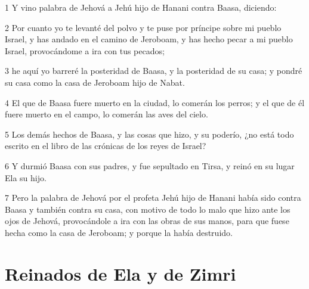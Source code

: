 \par 1 Y vino palabra de Jehová a Jehú hijo de Hanani contra Baasa, diciendo:
\par 2 Por cuanto yo te levanté del polvo y te puse por príncipe sobre mi pueblo Israel, y has andado en el camino de Jeroboam, y has hecho pecar a mi pueblo Israel, provocándome a ira con tus pecados;
\par 3 he aquí yo barreré la posteridad de Baasa, y la posteridad de su casa; y pondré su casa como la casa de Jeroboam hijo de Nabat.
\par 4 El que de Baasa fuere muerto en la ciudad, lo comerán los perros; y el que de él fuere muerto en el campo, lo comerán las aves del cielo.
\par 5 Los demás hechos de Baasa, y las cosas que hizo, y su poderío, ¿no está todo escrito en el libro de las crónicas de los reyes de Israel?
\par 6 Y durmió Baasa con sus padres, y fue sepultado en Tirsa, y reinó en su lugar Ela su hijo.
\par 7 Pero la palabra de Jehová por el profeta Jehú hijo de Hanani había sido contra Baasa y también contra su casa, con motivo de todo lo malo que hizo ante los ojos de Jehová, provocándole a ira con las obras de sus manos, para que fuese hecha como la casa de Jeroboam; y porque la había destruido.

\section*{Reinados de Ela y de Zimri}

